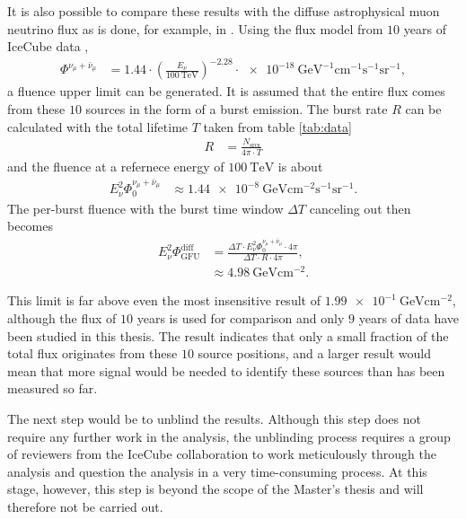 It is also possible to compare these results with the diffuse astrophysical muon neutrino flux as is done, for example, in \cite{thorben}.
Using the flux model from $\num{10}$ years of IceCube data \cite{flux_2},
\begin{align}
  \Phi^{\nu_\mu + \bar{\nu}_\mu} &= 1.44\cdot\left(\frac{E_\nu}{\SI{100}{\tera\electronvolt}}\right)^{-2.28}\cdot\SI{e-18}{\giga\electronvolt\tothe{-1}\centi\meter\tothe{-1}\second\tothe{-1}\steradian\tothe{-1}},
\end{align}
a fluence upper limit can be generated.
It is assumed that the entire flux comes from these $\num{10}$ sources in the form of a burst emission.
The burst rate $R$ can be calculated with the total lifetime $T$ taken from table \ref{tab:data}
\begin{align}
  R &= \frac{N_\text{srcs}}{4\pi\cdot T}
\end{align}
and the fluence at a refernece energy of $\SI{100}{\tera\electronvolt}$ is about
\begin{align}
  E^2_\nu\Phi_0^{\nu_\mu + \bar{\nu}_\mu} &\approx \SI{1.44e-8}{\giga\electronvolt\centi\meter\tothe{-2}\second\tothe{-1}\steradian\tothe{-1}}.
\end{align}
The per-burst fluence with the burst time window $\Delta T$ canceling out then becomes
\begin{align}
  E^2_\nu\Phi_\text{GFU}^\text{diff} &= \frac{\Delta T \cdot E^2_\nu\Phi_0^{\nu_\mu + \bar{\nu}_\mu} \cdot 4\pi}{\Delta T \cdot R \cdot 4\pi},\\
  &\approx \SI{4.98}{\giga\electronvolt\centi\meter\tothe{-2}}.
\end{align}

This limit is far above even the most insensitive result of $\SI{1.99e-1}{\giga\electronvolt\centi\meter\tothe{-2}}$, although the flux of $\num{10}$ years is used for comparison and only $\num{9}$ years of data have been studied in this thesis.
The result indicates that only a small fraction of the total flux originates from these $10$ source positions, and a larger result would mean that more signal would be needed to identify these sources than has been measured so far.

The next step would be to unblind the results. Although this step does not require any further work in the analysis, the unblinding process requires a group of reviewers from the IceCube collaboration to work meticulously through the analysis and question the analysis in a very time-consuming process. At this stage, however, this step is beyond the scope of the Master's thesis and will therefore not be carried out.

